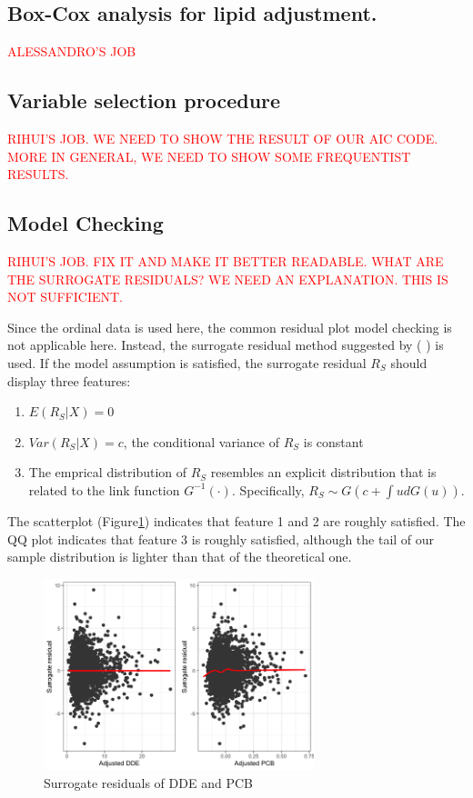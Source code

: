 \documentclass[wcp]{jmlr}%
\begin{document}
\subsection{Box-Cox analysis for lipid adjustment.}
\textcolor{red}{ALESSANDRO'S JOB}
\subsection{Variable selection procedure}
\textcolor{red}{RIHUI'S JOB. WE NEED TO SHOW THE RESULT OF OUR AIC CODE. MORE IN GENERAL, WE NEED TO SHOW SOME FREQUENTIST RESULTS.}
\subsection{Model Checking}
\textcolor{red}{RIHUI'S JOB. FIX IT AND MAKE IT BETTER READABLE. WHAT ARE THE SURROGATE RESIDUALS? WE NEED AN EXPLANATION. THIS IS NOT SUFFICIENT.}

Since the ordinal data is used here, the common residual plot model checking is not applicable here. Instead, the surrogate residual method suggested by (%
) is used. If the model assumption is satisfied, the surrogate residual $R_S$ should display three features: 

\begin{enumerate}
	\item $E(R_S|X)=0$
	\item $Var(R_S|X)=c$, the conditional variance of $R_S$ is constant
	\item The emprical distribution of $R_S$ resembles an explicit distribution that is related to the link function $G^{-1}(\cdot)$. Specifically, $R_S\sim G(c+\int ud G(u))$.
\end{enumerate}

The scatterplot (Figure\ref{fig:surrogateresid}) indicates that feature 1 and 2 are roughly satisfied. The QQ plot indicates that feature 3 is roughly satisfied, although the tail of our sample distribution is lighter than that of the theoretical one. 

\begin{figure}
	\centering
	\includegraphics[width=0.7\textwidth]{Surrogate_residuals.png}
	\caption{Surrogate residuals of DDE and PCB}
	\label{fig:surrogateresid}
\end{figure}
\end{document}
